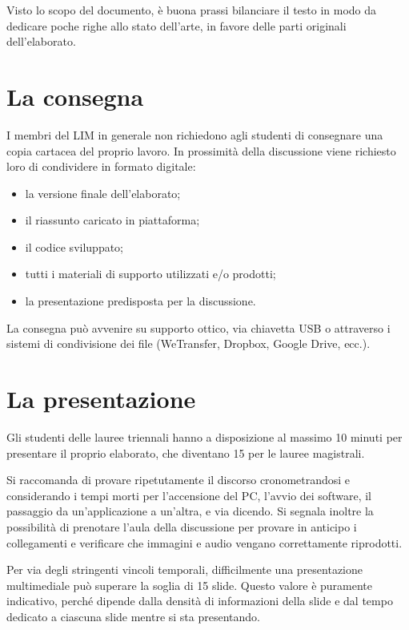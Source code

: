 \documentclass[12pt,italian]{report}
\begin{document}
Visto lo scopo del documento, è buona prassi bilanciare il testo in modo da dedicare poche righe allo stato dell'arte, in favore delle parti originali dell'elaborato.


\chapter{La consegna}

I membri del LIM in generale non richiedono agli studenti di consegnare una copia cartacea del proprio lavoro. In prossimità della discussione viene richiesto loro di condividere in formato digitale:

\begin{itemize}
	\item la versione finale dell'elaborato;
	\item il riassunto caricato in piattaforma;
	\item il codice sviluppato;
	\item tutti i materiali di supporto utilizzati e/o prodotti;
	\item la presentazione predisposta per la discussione.
\end{itemize}

La consegna può avvenire su supporto ottico, via chiavetta USB o attraverso i sistemi di condivisione dei file (WeTransfer, Dropbox, Google Drive, ecc.).



\chapter{La presentazione}

Gli studenti delle lauree triennali hanno a disposizione al massimo 10 minuti per presentare il proprio elaborato, che diventano 15 per le lauree magistrali. 

Si raccomanda di provare ripetutamente il discorso cronometrandosi e considerando i tempi morti per l'accensione del PC, l'avvio dei software, il passaggio da un'applicazione a un'altra, e via dicendo. Si segnala inoltre la possibilità di prenotare l'aula della discussione per provare in anticipo i collegamenti e verificare che immagini e audio vengano correttamente riprodotti.

Per via degli stringenti vincoli temporali, difficilmente una presentazione multimediale può superare la soglia di 15 slide. Questo valore è puramente indicativo, perché dipende dalla densità di informazioni della slide e dal tempo dedicato a ciascuna slide mentre si sta presentando.
\end{document}
